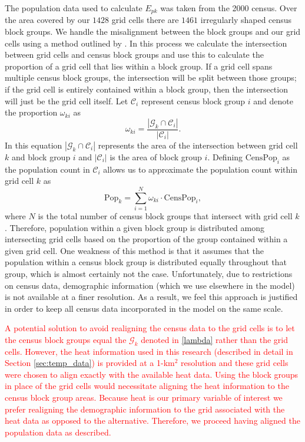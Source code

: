 \documentclass[final]{statsoc}
\begin{document}
The population data used to calculate $E_{pk}$ was taken from the 2000 census. 
Over the area covered
by our $1428$ grid cells there are $1461$ irregularly shaped census block groups. We handle
the misalignment between the block groups and our grid cells using a method outlined
by \cite{Brunsdon2015}. In this process we calculate the intersection
between grid cells and census block groups and use this to calculate the proportion of
a grid cell that lies within a block group. If a grid cell spans multiple
census block groups, the intersection will be split between those groups; if the grid cell 
is entirely contained within a block group, then the intersection will just be the grid cell 
itself. Let $\mathcal{C}_i$ represent census block group $i$ and denote the proportion
$\omega_{ki}$ as
$$\omega_{ki} = \frac{\left| \mathcal{G}_k \cap \mathcal{C}_i \right|}
  {\left|\mathcal{C}_i\right|}.$$ 
In this equation $\left| \mathcal{G}_k \cap \mathcal{C}_i \right|$ represents
the area of the intersection between grid cell $k$ and block group $i$ and 
$\left| \mathcal{C}_i \right|$ is the area of block group $i$. 
Defining $\text{CensPop}_i$ as the population count in $\mathcal{C}_i$ allows us to approximate the population count
within grid cell $k$ as $$\text{Pop}_k = \sum_{i=1}^{N} \omega_{ki}\cdot \text{CensPop}_i,$$
where $N$ is the total
number of census block groups that intersect with grid cell $k$. Therefore, population within
a given block group is distributed among intersecting grid cells based on the proportion
of the group contained within a given grid cell. One weakness of this 
method is that it assumes that the population within
a census block group is distributed equally throughout that group, which is almost
certainly not the case. Unfortunately, due to restrictions on census data, demographic information (which we use elsewhere in the model) is not available at a finer resolution. As a result, we feel this approach is justified in order to keep all census data incorporated in the model on the same scale.

\textcolor{red}{A potential solution to avoid realigning the census data to the grid cells is to let the census block groups equal the $\mathcal{G}_k$ denoted in \eqref{lambda} rather than the grid cells. However, the heat information used in this research (described in detail in Section \ref{sec:temp_data}) is provided at a 1-km$^2$ resolution and these grid cells were chosen to align exactly with the available heat data. Using the block groups in place of the grid cells would necessitate aligning the heat information to the census block group areas. Because heat is our primary variable of interest we prefer realigning the demographic information to the grid associated with the heat data as opposed to the alternative. Therefore, we proceed having aligned the population data as described.}
\end{document}

